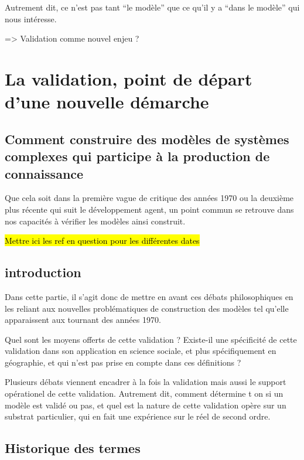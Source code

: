 Autrement dit, ce n'est pas tant \enquote{le modèle} que ce qu'il y a \enquote{dans le modèle} qui nous intéresse. \autocite{Sanders2000} 

=> Validation comme nouvel enjeu ?

\section{La validation, point de départ d'une nouvelle démarche}

\subsection{Comment construire des modèles de systèmes complexes qui participe à la production de connaissance}

Que cela soit dans la première vague de critique des années 1970 ou la deuxième plus récente qui suit le développement agent, un point commun se retrouve dans nos capacités à vérifier les modèles ainsi construit. 

\hl{Mettre ici les ref en question pour les différentes dates}

\subsection{introduction}

Dans cette partie, il s'agit donc de mettre en avant ces débats philosophiques en les reliant aux nouvelles problématiques de construction des modèles tel qu'elle apparaissent aux tournant des années 1970.

Quel sont les moyens offerts de cette validation ? Existe-il une spécificité de cette validation dans son application en science sociale, et plus spécifiquement en géographie, et qui n'est pas prise en compte dans ces définitions ?

Plusieurs débats viennent encadrer à la fois la validation mais aussi le support opérationel de cette validation. Autrement dit, comment détermine t on si un modèle est validé ou pas, et quel est la nature de cette validation opère sur un substrat particulier, qui en fait une expérience sur le réel de second ordre.

\subsection{Historique des termes}

